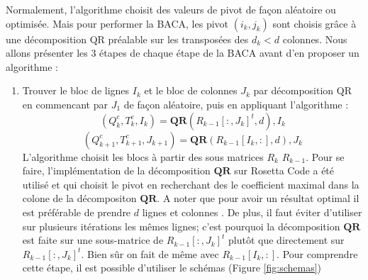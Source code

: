 \documentclass[10pt]{SelfArx} %
\begin{document}
Normalement, l'algorithme choisit des valeurs de pivot de façon aléatoire ou optimisée. Mais pour performer la BACA, les pivot $(i_k,j_k)$ sont choisis grâce à une décomposition QR préalable\cite{liu_parallel_2020} sur les transposées des $d_k<d$ colonnes. Nous allons présenter les 3 étapes de chaque étape de la BACA avant d'en proposer un algorithme :
\begin{enumerate}[noitemsep] %
    \item Trouver le bloc de lignes $I_k$ et le bloc de colonnes $J_k$ par décomposition QR \cite{ros_code} en commencant par $J_1$ de façon aléatoire, puis en appliquant l'algorithme :
    \begin{equation}
        (Q_k^c,T_k^c,I_k)=\mathbf{QR}(R_{k-1}[:,J_k]^t,d),I_k
    \end{equation}
    \begin{equation}
        (Q_{k+1}^c,T_{k+1}^c,J_{k+1})=\mathbf{QR}(R_{k-1}[I_k,:],d),J_k
    \end{equation}
    L'algorithme choisit les blocs à partir des sous matrices $R_k$ $R_{k-1}$. Pour se faire, l'implémentation de la décomposition $\mathbf{QR}$ sur Rosetta Code a été utilisé \cite{ros_code} et qui choisit le pivot en recherchant des le coefficient maximal dans la colone de la décompositon $\mathbf{QR}$. 
    A noter que pour avoir un résultat optimal il est préférable de prendre $d$ lignes et colonnes \cite{liu_parallel_2020}. De plus, il faut éviter d'utiliser sur plusieurs itérations les mêmes lignes; c'est pourquoi la décomposition $\mathbf{QR}$ est faite  sur une sous-matrice de $R_{k-1}[:,J_k]^t$ plutôt que directement sur $R_{k-1}[:,J_k]^t$. Bien sûr on fait de même avec $R_{k-1}[I_k,:]$. Pour comprendre cette étape, il est possible d'utiliser le schémas (Figure \ref{fig:schemas})
    

\end{enumerate}
\end{document}
